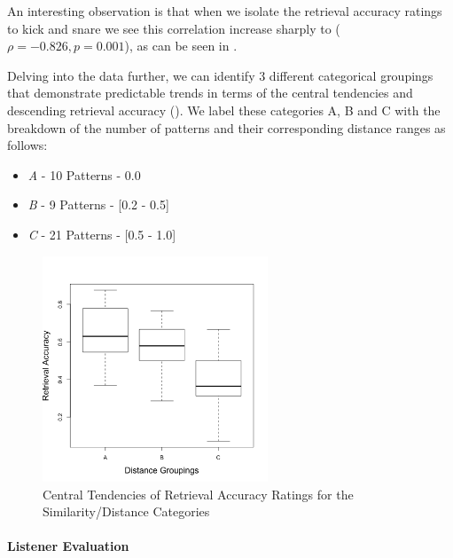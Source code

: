 An interesting observation is that when we isolate the retrieval accuracy ratings to kick and snare we see this correlation increase sharply to ($\rho = -0.826, p = 0.001$), as can be seen in .

Delving into the data further, we can identify 3 different categorical groupings that demonstrate predictable trends in terms of the central tendencies and descending retrieval accuracy (). We label these categories A, B and C with the breakdown of the number of patterns and their corresponding distance ranges as follows:

\begin{itemize}
  \item \textit{A} - 10 Patterns - 0.0
  \item \textit{B} - 9 Patterns - [0.2 - 0.5]
  \item \textit{C} - 21 Patterns - [0.5 - 1.0]
\end{itemize}

\begin{figure}
	\begin{center}
		\includegraphics[width=0.6\textwidth]{ch07_evaluation/figures/new_retrieval_plot.png}
	\end{center}
	\caption[Central Tendencies of Retrieval Accuracy Ratings for the Similarity/Distance Categories
]{Central Tendencies of Retrieval Accuracy Ratings for the Similarity/Distance Categories}
	\label{fig:central_tendencies}
\end{figure}

\paragraph{Listener Evaluation}

